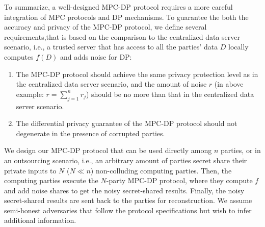 To summarize, a well-designed MPC-DP protocol requires a more careful integration of MPC protocols and DP mechanisms. To guarantee the both the accuracy and privacy of the MPC-DP protocol, we define several requirements,that is based on the comparison to the centralized data server scenario, i.e., a trusted server that has access to all the parties' data $D$ locally computes $f\left( D\right) $ and adds noise for DP:

\begin{enumerate}
	\item The MPC-DP protocol should achieve the same privacy protection level as in the centralized data server scenario, and the amount of noise $r$ (in above example: $r=\sum_{j=1}^{n} r_j$) should be no more than that in the centralized data server scenario.
	\item The differential privacy guarantee of the MPC-DP protocol should not degenerate in the presence of corrupted parties.
\end{enumerate}

We design our MPC-DP protocol that can be used directly among $n$ parties, or in an outsourcing scenario, i.e., an arbitrary amount of parties secret share their private inputs to $N$ ($N\ll n$) non-colluding computing parties. Then, the computing parties execute the $N$-party MPC-DP protocol, where they compute $f$ and add noise shares to get the noisy secret-shared results. Finally, the noisy secret-shared results are sent back to the parties for reconstruction. We assume semi-honest adversaries that follow the protocol specifications but wish to infer additional information.




